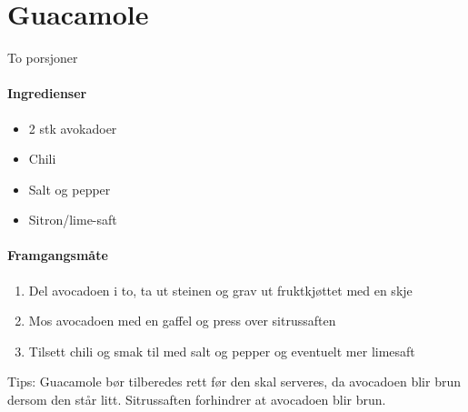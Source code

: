 \section{﻿Guacamole}
To porsjoner

\paragraph{Ingredienser}
\begin{itemize}[noitemsep]
	\item 2 stk avokadoer
	\item Chili
	\item Salt og pepper
	\item Sitron/lime-saft
\end{itemize}


\paragraph{Framgangsmåte}
\begin{enumerate}[noitemsep]
	\item Del avocadoen i to, ta ut steinen og grav ut fruktkjøttet med en skje
	\item Mos avocadoen med en gaffel og press over sitrussaften
	\item Tilsett chili og smak til med salt og pepper og eventuelt mer limesaft
\end{enumerate}


Tips: Guacamole bør tilberedes rett før den skal serveres, da avocadoen blir brun dersom den står litt. Sitrussaften forhindrer at avocadoen blir brun.
